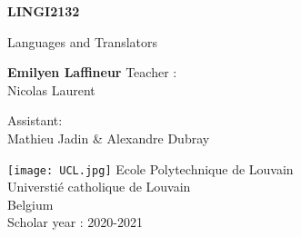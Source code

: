 \begin{titlepage}
    \begin{center}
        \vspace*{1cm}
        
        \huge
        \textbf{LINGI2132}
        \vspace{0.5cm}
        
        \LARGE
        Languages and Translators
        \vspace{1.5cm}
        
        \textbf{Emilyen Laffineur}
        \vfill
        Teacher :\\
        Nicolas Laurent
        \vspace{0.8cm}
        
        Assistant:\\
        Mathieu Jadin \& Alexandre Dubray
        
        \texttt{[image: UCL.jpg]}
        \Large
        Ecole Polytechnique de Louvain\\
        Universtié catholique de Louvain\\
        Belgium\\
        Scholar year : 2020-2021
    \end{center}
\end{titlepage}